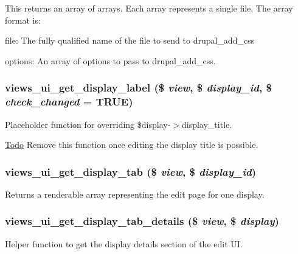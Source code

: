 This returns an array of arrays. Each array represents a single file. The array format is:
\begin{DoxyItemize}
\item file: The fully qualified name of the file to send to drupal\_\-add\_\-css
\item options: An array of options to pass to drupal\_\-add\_\-css. 
\end{DoxyItemize}\hypertarget{admin_8inc_a20b56808cc1c748e9a5d95b0753367b2}{
\subsubsection[{views\_\-ui\_\-get\_\-display\_\-label}]{\setlength{\rightskip}{0pt plus 5cm}views\_\-ui\_\-get\_\-display\_\-label (\$ {\em view}, \/  \$ {\em display\_\-id}, \/  \$ {\em check\_\-changed} = {\ttfamily TRUE})}}
\label{admin_8inc_a20b56808cc1c748e9a5d95b0753367b2}
Placeholder function for overriding \$display-\/$>$display\_\-title.

\begin{Desc}
\item[\hyperlink{todo__todo000051}{Todo}]Remove this function once editing the display title is possible. \end{Desc}
\hypertarget{admin_8inc_a260d67b28a279ec95f4222eca0137bb1}{
\subsubsection[{views\_\-ui\_\-get\_\-display\_\-tab}]{\setlength{\rightskip}{0pt plus 5cm}views\_\-ui\_\-get\_\-display\_\-tab (\$ {\em view}, \/  \$ {\em display\_\-id})}}
\label{admin_8inc_a260d67b28a279ec95f4222eca0137bb1}
Returns a renderable array representing the edit page for one display. \hypertarget{admin_8inc_ac85eb125b7c9a2a81bd2b5a0578dc587}{
\subsubsection[{views\_\-ui\_\-get\_\-display\_\-tab\_\-details}]{\setlength{\rightskip}{0pt plus 5cm}views\_\-ui\_\-get\_\-display\_\-tab\_\-details (\$ {\em view}, \/  \$ {\em display})}}
\label{admin_8inc_ac85eb125b7c9a2a81bd2b5a0578dc587}
Helper function to get the display details section of the edit UI.


